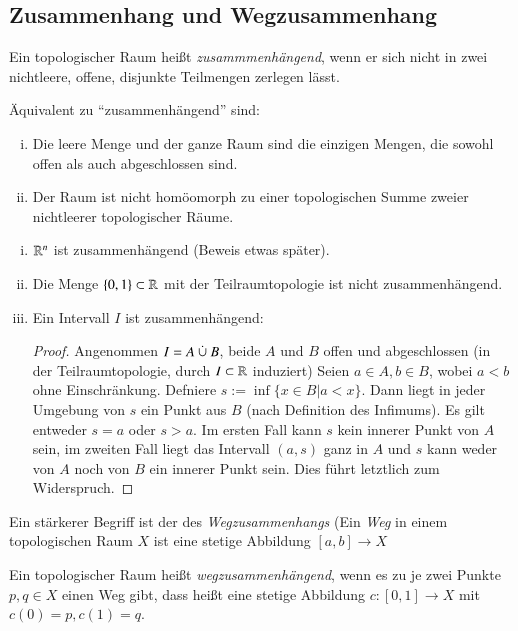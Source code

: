 \documentclass[a4paper,10pt]{scrartcl}
\begin{document}
\subsection{Zusammenhang und Wegzusammenhang}
\begin{df}
Ein topologischer Raum heißt \emph{zusammmenhängend}, wenn er sich nicht in zwei nichtleere, offene, disjunkte Teilmengen zerlegen lässt.
\end{df}
\begin{figure}[H]
\centering
 \fixme[fig19]
\caption{}
\end{figure}
\begin{note*}
Äquivalent zu "`zusammenhängend"' sind:
\begin{enumerate}[(i)]
\item Die leere Menge und der ganze Raum sind die einzigen Mengen, die sowohl offen als auch abgeschlossen sind.
\item Der Raum ist nicht homöomorph zu einer topologischen Summe zweier nichtleerer topologischer Räume.
\end{enumerate}
\end{note*}
\begin{exs*}
\begin{enumerate}[(i)]
\item $ \mathbb{R}^n $ ist zusammenhängend (Beweis etwas später).
\item Die Menge $ \{0,1\} \subset \mathbb{R}$ mit der Teilraumtopologie ist nicht zusammenhängend.
\item Ein Intervall $ I $ ist zusammenhängend: 
\begin{proof}
Angenommen $I=A\mathbin{\dot{\cup}} B$, beide $ A $ und $ B $ offen und abgeschlossen (in der Teilraumtopologie, durch $ I\subset \mathbb{R} $ induziert) Seien $ a\in A, b\in B $, wobei $ a<b $ ohne Einschränkung. Defniere $ s:=\inf\{x\in B|a<x\}$. Dann liegt in jeder Umgebung von $ s $ ein Punkt aus $ B $ (nach Definition des Infimums). Es gilt entweder $ s=a $ oder $ s>a $. Im ersten Fall kann $ s $ kein innerer Punkt von $ A $ sein, im zweiten Fall liegt das Intervall $ (a,s) $ ganz in $ A $ und $ s $ kann weder von $ A $ noch von $ B $ ein innerer Punkt sein. Dies führt letztlich zum Widerspruch.
\end{proof}
\end{enumerate}
\end{exs*}
Ein stärkerer Begriff ist der des \emph{Wegzusammenhangs} (Ein \emph{Weg} in einem topologischen Raum $ X $ ist eine stetige Abbildung $ [a,b]\to X $
\begin{df}
Ein topologischer Raum heißt \emph{wegzusammenhängend}, wenn es zu je zwei Punkte $ p,q\in X $ einen Weg gibt, dass heißt eine stetige Abbildung $ c: [0,1]\to X $ mit $c(0)=p, c(1)=q$.
\end{df}
\end{document}
